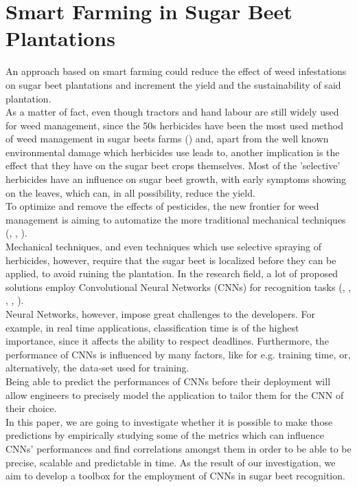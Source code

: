 \section{Smart Farming in Sugar Beet Plantations}
An approach based on smart farming could reduce the effect of weed infestations on sugar beet plantations and  increment the yield and the sustainability of said plantation.\\
As a matter of fact, even though tractors and hand labour are still widely used for weed management, since the 50s herbicides have been the most used method of weed management in sugar beets farms (\cite{cioni_weed_2010}) and, apart from the well known environmental damage which herbicides use leads to, another implication is the effect that they have on the sugar beet crops themselves. Most of the 'selective' herbicides have an influence on sugar beet growth, with early symptoms showing on the leaves, which can, in all possibility, reduce the yield. \cite{petersen_review_2004}\\
To optimize and remove the effects of pesticides, the new frontier for weed management is aiming to automatize the more traditional mechanical techniques (\cite{raja_real-time_2020}, \cite{frasconi_design_2014}, \cite{machleb_sensor-based_2021}).\\
Mechanical techniques, and even techniques which use selective spraying of herbicides, however, require that the sugar beet is localized before they can be applied, to avoid ruining the plantation. In the research field, a lot of proposed solutions employ Convolutional Neural Networks (CNNs) for recognition tasks (\cite{gao_deep_2020}, \cite{suh_transfer_2018}, \cite{ramirez_deep_2020},  \cite{milioto2017real}, \cite{agriculture11111111}).\\
Neural Networks, however, impose great challenges to the developers. For example, in real time applications, classification time is of the highest importance, since it affects the ability to respect deadlines. Furthermore, the performance of CNNs is influenced by many factors, like for e.g. training time, or, alternatively, the data-set used for training.\\ %
Being able to predict the performances of CNNs before their deployment will allow engineers to precisely model the application to tailor them for the CNN of their choice. \\
In this paper, we are going to investigate whether it is possible to make those predictions by empirically studying some of the metrics which can influence CNNs' performances and find correlations amongst them in order to be able to be precise, scalable and predictable in time. As the result of our investigation, we aim to develop a toolbox for the employment of CNNs in sugar beet recognition.

